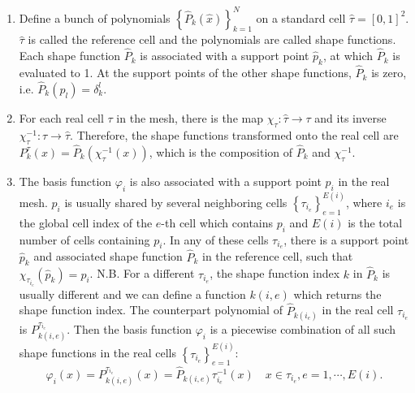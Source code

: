 \documentclass[11pt, a4paper]{article}
\begin{document}
\begin{enumerate}
\item Define a bunch of polynomials $\left\{ \hat{P}_k(\hat{x}) \right\}_{k=1}^N$ on a
  standard cell $\hat{\tau}=[0,1]^2$. $\hat{\tau}$ is called the reference cell and the
  polynomials are called shape functions. Each shape function $\hat{P}_k$ is associated
  with a support point $\hat{p}_k$, at which $\hat{P}_k$ is evaluated to 1. At the support
  points of the other shape functions, $\hat{P}_k$ is zero, i.e.
  $\hat{P}_k(\hat{p}_{l}) = \delta_k^l$.
\item For each real cell $\tau$ in the mesh, there is the map
  $\chi_{\tau}: \hat{\tau} \rightarrow \tau$ and its inverse
  $\chi_{\tau}^{-1}: \tau \rightarrow \hat{\tau}$. Therefore, the shape functions
  transformed onto the real cell are $P_k^{\tau}(x) = \hat{P}_k(\chi_{\tau}^{-1}(x))$, which is
  the composition of $\hat{P}_k$ and $\chi_{\tau}^{-1}$.
\item The basis function $\varphi_i$ is also associated with a support point $p_i$ in the
  real mesh. $p_i$ is usually shared by several neighboring cells
  $\left\{ \tau_{i_{e}} \right\}_{e=1}^{E(i)}$, where $i_e$ is the global cell index of
  the $e$-th cell which contains $p_i$ and $E(i)$ is the total number of cells containing
  $p_i$. In any of these cells $\tau_{i_e}$, there is a support point $\hat{p}_k$ and
  associated shape function $\hat{P}_k$ in the reference cell, such that
  $\chi_{\tau_{i_e}}(\hat{p}_k) = p_i$. N.B. For a different $\tau_{i_e}$, the shape
  function index $k$ in $\hat{P}_k$ is usually different and we can define a function
  $k(i, e)$ which returns the shape function index. The counterpart polynomial of
  $\hat{P}_{k(i_e)}$ in the real cell $\tau_{i_e}$ is $P_{k(i, e)}^{\tau_{i_e}}$. Then the
  basis function $\varphi_i$ is a piecewise combination of all such shape functions in the
  real cells $\left\{ \tau_{i_e} \right\}_{e=1}^{E(i)}$:
  \begin{equation}
    \label{eq:basis-function-from-shape-functions}
    \varphi_i(x) = P_{k(i,e)}^{\tau_{i_e}}(x) = \hat{P}_{k(i,e)}\tau_{i_e}^{-1}(x) \quad x\in\tau_{i_e}, e=1,\cdots,E(i).
  \end{equation}
\end{enumerate}
\end{document}

